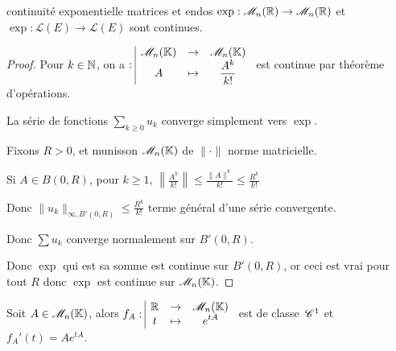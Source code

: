 \begin{proposition}{continuité exponentielle matrices et endos}{}
    $\exp : \mathscr M_n(\mathbb{R}) \to \mathscr M_n(\mathbb{R})$ et 
    $\exp : \mathscr L(E) \to \mathscr L(E)$ sont continues. 
\end{proposition}


\begin{proof}
    Pour $k \in \mathbb{N}$, on a 
    $: \space \begin{array}{|ccc} \displaystyle \mathscr M_n(\mathbb{K}) & \to & \displaystyle \mathscr M_n(\mathbb{K}) \\ \displaystyle A & \mapsto & \displaystyle \frac{A^k}{k!} \end{array}$ est continue par 
    théorème d'opérations. 

    La série de fonctions $\sum_{k \geqslant 0} u_k$ converge simplement 
    vers $\exp$. 

    Fixons $R > 0$, et munisson $\mathscr M_n(\mathbb{K})$ de $\| \cdot \|$ norme matricielle. 

    Si $A \in B(0, R)$, pour $k \geqslant 1$, $\left\| \frac{A^k}{k!} \right\| \leqslant \frac{\|A\|^k}{k!} \leqslant \frac{R^k}{k!}$

    Donc $\|u_k\|_{\infty, B'(0, R)} \leqslant \frac{R^k}{k!}$ terme général d'une série convergente. 

    Donc $\sum u_k$ converge normalement sur $B'(0, R)$. 

    Donc $\exp$ qui est sa somme est continue sur $B'(0, R)$, or ceci est vrai pour tout $R$
    donc $\exp$ est continue sur $\mathscr M_n(\mathbb{K})$.
\end{proof}


\begin{proposition}{}{}
    Soit $A \in \mathscr M_n(\mathbb{K})$, alors $f_A: \space \begin{array}{|ccc} \displaystyle \mathbb{R} & \to & \displaystyle \mathscr M_n(\mathbb{K}) \\ \displaystyle t & \mapsto & \displaystyle e^{tA} \end{array}$ est de classe $\,\mathscr C^{1}$ 
    et $f_A'(t) = A e^{tA}$.
\end{proposition}

